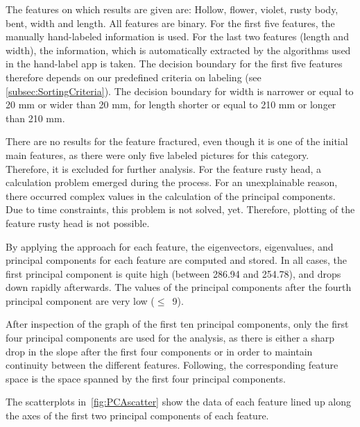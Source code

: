 \bigskip
The features on which results are given are: Hollow, flower, violet, rusty body, bent, width and length. All features are binary. For the first five features, the manually hand-labeled information is used. For the last two features (length and width), the information, which is automatically extracted by the algorithms used in the hand-label app is taken. The decision boundary for the first five features therefore depends on our predefined criteria on labeling (see \autoref{subsec:SortingCriteria}). The decision boundary for width is narrower or equal to 20 mm or wider than 20 mm, for length shorter or equal to 210 mm or longer than 210 mm.

There are no results for the feature fractured, even though it is one of the initial main features, as there were only five labeled pictures for this category. Therefore, it is excluded for further analysis. For the feature rusty head, a calculation problem emerged during the process. For an unexplainable reason, there occurred complex values in the calculation of the principal components. Due to time constraints, this problem is not solved, yet. Therefore, plotting of the feature rusty head is not possible.

By applying the approach for each feature, the eigenvectors, eigenvalues, and principal components for each feature are computed and stored. In all cases, the first principal component is quite high (between 286.94 and 254.78), and drops down rapidly afterwards. The values of the principal components after the fourth principal component are very low ($\leq$~9).

\bigskip
After inspection of the graph of the first ten principal components,  only the first four principal components are used for the analysis, as there is either a sharp drop in the slope after the first four components or in order to maintain continuity between the different features. Following, the corresponding feature space is the space spanned by the first four principal components.

The scatterplots in~\autoref{fig:PCAscatter} show the data of each feature lined up along the axes of the first two principal components of each feature.


